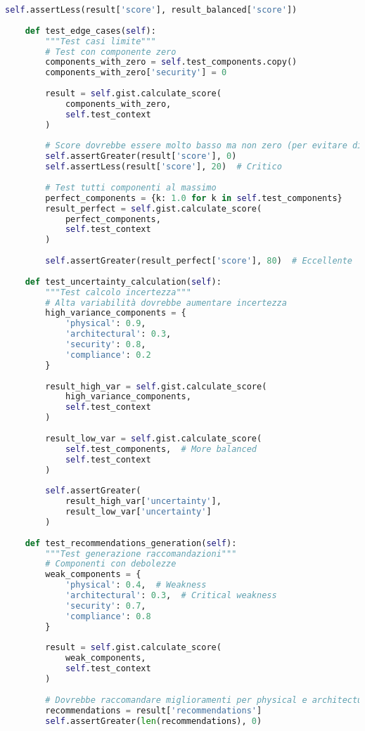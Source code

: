 \begin{lstlisting}[language=Python, caption=Suite di Test per Framework GIST]
        self.assertLess(result['score'], result_balanced['score'])
    
    def test_edge_cases(self):
        """Test casi limite"""
        # Test con componente zero
        components_with_zero = self.test_components.copy()
        components_with_zero['security'] = 0
        
        result = self.gist.calculate_score(
            components_with_zero,
            self.test_context
        )
        
        # Score dovrebbe essere molto basso ma non zero (per evitare divisioni)
        self.assertGreater(result['score'], 0)
        self.assertLess(result['score'], 20)  # Critico
        
        # Test tutti componenti al massimo
        perfect_components = {k: 1.0 for k in self.test_components}
        result_perfect = self.gist.calculate_score(
            perfect_components,
            self.test_context
        )
        
        self.assertGreater(result_perfect['score'], 80)  # Eccellente
    
    def test_uncertainty_calculation(self):
        """Test calcolo incertezza"""
        # Alta variabilità dovrebbe aumentare incertezza
        high_variance_components = {
            'physical': 0.9,
            'architectural': 0.3,
            'security': 0.8,
            'compliance': 0.2
        }
        
        result_high_var = self.gist.calculate_score(
            high_variance_components,
            self.test_context
        )
        
        result_low_var = self.gist.calculate_score(
            self.test_components,  # More balanced
            self.test_context
        )
        
        self.assertGreater(
            result_high_var['uncertainty'],
            result_low_var['uncertainty']
        )
    
    def test_recommendations_generation(self):
        """Test generazione raccomandazioni"""
        # Componenti con debolezze
        weak_components = {
            'physical': 0.4,  # Weakness
            'architectural': 0.3,  # Critical weakness
            'security': 0.7,
            'compliance': 0.8
        }
        
        result = self.gist.calculate_score(
            weak_components,
            self.test_context
        )
        
        # Dovrebbe raccomandare miglioramenti per physical e architectural
        recommendations = result['recommendations']
        self.assertGreater(len(recommendations), 0)
        

\end{lstlisting}
